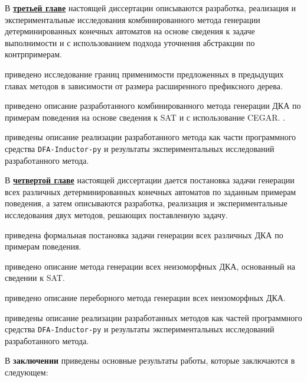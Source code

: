 
В \textbf{\underline{третьей главе}} настоящей диссертации описываются разработка, реализация и экспериментальные исследования комбинированного метода генерации детерминированных конечных автоматов на основе сведения к задаче выполнимости и с использованием подхода уточнения абстракции по контрпримерам.

\insection{\ref{sec:cegar:motivation}} приведено исследование границ применимости предложенных в предыдущих главах методов в зависимости от размера расширенного префиксного дерева. 

\insection{\ref{sec:cegar:cegar-algo}} приведено описание разработанного комбинированного метода генерации ДКА по примерам поведения на основе сведения к SAT и с использование CEGAR. .

\insection{\ref{sec:cegar:results}} приведены описание реализации разработанного метода как части программного средства \texttt{DFA-Inductor-py} и результаты экспериментальных исследований разработанного метода. 


В \textbf{\underline{четвертой главе}} настоящей диссертации дается постановка задачи генерации всех различных детерминированных конечных автоматов по заданным примерам поведения, а затем описываются разработка, реализация и экспериментальные исследования двух методов, решающих поставленную задачу. 

\insection{\ref{sec:findall:problem}} приведена формальная постановка задачи генерации всех различных ДКА по примерам поведения.  

\insection{\ref{sec:findall:SAT-based}} приведено описание метода генерации всех неизоморфных ДКА, основанный на сведении к SAT.  

\insection{\ref{sec:findall:backtracking}} приведено описание переборного метода генерации всех неизоморфных ДКА.  

\insection{\ref{sec:findall:results}} приведены описание реализации разработанных методов как частей программного средства \texttt{DFA-Inductor-py} и результаты экспериментальных исследований разработанного метода. 



В \textbf{заключении} приведены основные результаты работы, которые заключаются в следующем:

